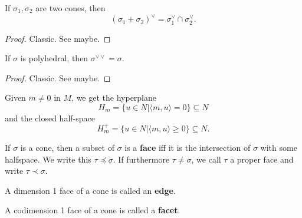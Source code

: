 \begin{proposition}
  \label{1-2-dual-cone-add}

  If $\sigma_1, \sigma_2$ are two cones, then
  $$(\sigma_1 + \sigma_2)^\vee = \sigma_1^\vee \cap \sigma_2^\vee.$$
\end{proposition}
\begin{proof}
  \uses{}

  Classic. See \cite{Oda_1988} maybe.
\end{proof}


\begin{proposition}
  \label{1-2-4-double-dual-polyhedral-cone}

  If $\sigma$ is polyhedral, then $\sigma^{\vee\vee} = \sigma$.
\end{proposition}
\begin{proof}
  \uses{}

  Classic. See \cite{Oda_1988} maybe.
\end{proof}


Given $m \ne 0$ in $M$, we get the hyperplane
$$H_m = \{u \in N | \langle m, u\rangle = 0\} \subseteq N$$
and the closed half-space
$$H_m^+ = \{u \in N | \langle m, u\rangle \ge 0\} \subseteq N.$$


\begin{definition}
  \label{1-2-5-face}
  \uses{}
  \leanok

  If $\sigma$ is a cone, then a subset of $\sigma$ is a {\bf face} iff it is the intersection of $\sigma$ with some halfspace. We write this $\tau \preceq \sigma$. If furthermore $\tau \ne \sigma$, we call $\tau$ a proper face and write $\tau \prec \sigma$.
\end{definition}


\begin{definition}
  \label{1-2-5-edge}

  A dimension 1 face of a cone is called an {\bf edge}.
\end{definition}


\begin{definition}
  \label{1-2-5-facet}

  A codimension 1 face of a cone is called a {\bf facet}.
\end{definition}


